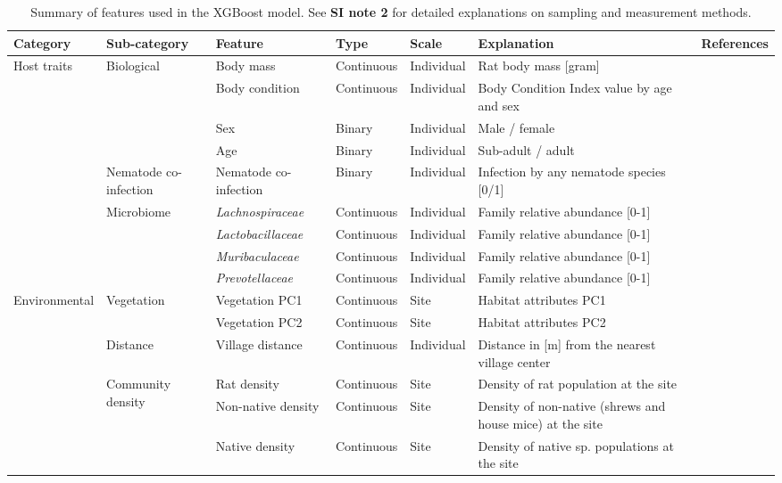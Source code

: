 \documentclass[oneside, a4paper, onecolumn, 11pt]{article}
\begin{document}
\begin{landscape}
\begin{table}[h]
\centering
\caption{Summary of features used in the XGBoost model. See \textbf{SI note 2} for detailed explanations on sampling and measurement methods.}
\label{tab:table 1}
\begin{tabular}{p{2.5cm} p{3.8cm} p{3.8cm} p{2cm} p{1.8cm} p{8cm} p{2cm}}
\toprule
\textbf{Category} & \textbf{Sub-category} & \textbf{Feature} & \textbf{Type} & \textbf{Scale} & \textbf{Explanation} & \textbf{References} \\
\midrule
\multirow{9}{*}{Host traits} & \multirow{4}{*}{Biological} & Body mass & Continuous & Individual & Rat body mass [gram] & \citep{Sanchez2018-tf,Durkin2015-eu} \\
 & & Body condition & Continuous & Individual & Body Condition Index value by age and sex & \\
 & & Sex & Binary & Individual & Male / female & \citep{Grear2009-ch,Klein2004-sz} \\
 & & Age & Binary & Individual & Sub-adult / adult & \citep{Cornell2008-cx,Santin2023-yk,Preston2025-cn} \\
\cmidrule{2-7}
 & Nematode co-infection & Nematode co-infection & Binary & Individual & Infection by any nematode species [0/1] & \citep{Mabbott2018-wb,Rodgers2024-hl,Ezenwa2016-dq}  \\
\cmidrule{2-7}
 & \multirow{4}{*}{Microbiome} & \textit{Lachnospiraceae} & Continuous & Individual & Family relative abundance [0-1] &  \\
 & & \textit{Lactobacillaceae} & Continuous & Individual & Family relative abundance [0-1] & \citep{Rosshart2017-pu,Levy2017-ec,Bernardo-Cravo2020-yr,Chabe2017-lh} \\
 & & \textit{Muribaculaceae} & Continuous & Individual & Family relative abundance [0-1] & \\
 & & \textit{Prevotellaceae} & Continuous & Individual & Family relative abundance [0-1] &  \\
\midrule
\multirow{7}{*}{Environmental} & \multirow{2}{*}{Vegetation} & Vegetation PC1 & Continuous & Site & Habitat attributes PC1 &  \\
 & & Vegetation PC2 & Continuous & Site & Habitat attributes PC2 & \citep{Gottdenker2014-by,Patz2000-cg,Kiene2021-ie} \\
\cmidrule{2-6}
 & Distance & Village distance & Continuous & Individual & Distance in [m] from the nearest village center &  \\
\cmidrule{2-7}
 & \multirow{3}{*}{Community density} & Rat density & Continuous & Site & Density of rat population at the site &  \\
 & & Non-native density & Continuous & Site & Density of non-native (shrews and house mice) at the site & \citep{Patterson2013-tk,Arneberg1998-bl,Begon2002-or,Gajewski2024-wb} \\
 & & Native density & Continuous & Site & Density of native sp. populations at the site & \\
\bottomrule
\end{tabular}
\end{table}
\end{landscape}
\end{document}
